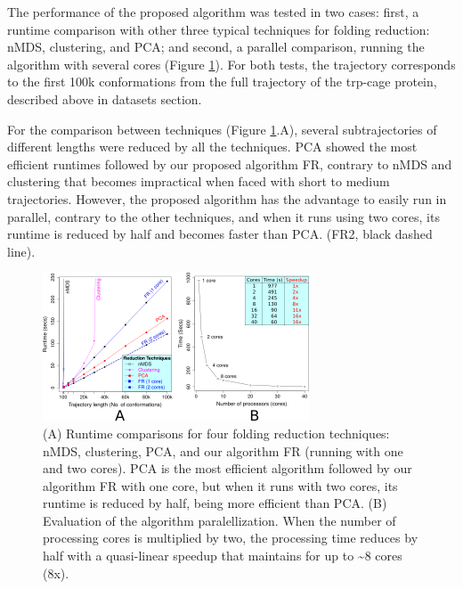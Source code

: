 \documentclass[american,twocolumn]{bmcart}
\begin{document}
The performance of the proposed algorithm was tested in two cases: first, a runtime comparison with other three typical techniques for folding reduction: nMDS, clustering, and PCA; and second, a parallel comparison, running the algorithm with several cores (Figure \ref{fig:Performance-methods}). For both tests, the trajectory corresponds to the first 100k conformations from the full trajectory of the trp-cage protein, described above in datasets section. 

For the comparison between techniques (Figure \ref{fig:Performance-methods}.A), several subtrajectories of different lengths were reduced by all the techniques. PCA showed the most efficient runtimes followed by our proposed algorithm FR, contrary to nMDS and clustering that becomes impractical when faced with short to medium trajectories. However, the proposed algorithm has the advantage to easily run in parallel, contrary to the other techniques, and when it runs using two cores, its runtime is reduced by half and becomes faster than PCA. (FR2, black dashed line).

\begin{figure}[th]
\begin{centering}
\includegraphics{images/performance-times}
\par\end{centering}
\caption{ (A) Runtime comparisons for four folding reduction techniques: nMDS, clustering, PCA, and our algorithm FR (running with one and two cores). PCA is the most efficient algorithm followed by our algorithm FR with one core, but when it runs with two cores, its runtime is reduced by half, being more efficient than PCA.  (B) Evaluation of the algorithm paralellization. When the number of processing cores is multiplied by two, the processing time reduces by half with a quasi-linear speedup that maintains for up to \textasciitilde{}8 cores (8x). \label{fig:Performance-methods}\protect \\
}
\end{figure}
\end{document}
